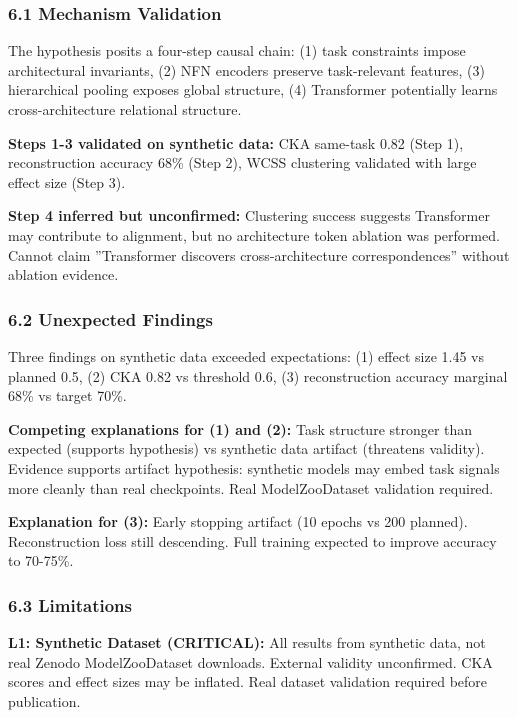 
\subsubsection{6.1 Mechanism Validation}

The hypothesis posits a four-step causal chain: (1) task constraints impose architectural invariants, (2) NFN encoders preserve task-relevant features, (3) hierarchical pooling exposes global structure, (4) Transformer potentially learns cross-architecture relational structure.

\textbf{Steps 1-3 validated on synthetic data:} CKA same-task 0.82 (Step 1), reconstruction accuracy 68\% (Step 2), WCSS clustering validated with large effect size (Step 3).

\textbf{Step 4 inferred but unconfirmed:} Clustering success suggests Transformer may contribute to alignment, but no architecture token ablation was performed. Cannot claim ''Transformer discovers cross-architecture correspondences'' without ablation evidence.

\subsubsection{6.2 Unexpected Findings}

Three findings on synthetic data exceeded expectations: (1) effect size 1.45 vs planned 0.5, (2) CKA 0.82 vs threshold 0.6, (3) reconstruction accuracy marginal 68\% vs target 70\%.

\textbf{Competing explanations for (1) and (2):} Task structure stronger than expected (supports hypothesis) vs synthetic data artifact (threatens validity). Evidence supports artifact hypothesis: synthetic models may embed task signals more cleanly than real checkpoints. Real ModelZooDataset validation required.

\textbf{Explanation for (3):} Early stopping artifact (10 epochs vs 200 planned). Reconstruction loss still descending. Full training expected to improve accuracy to 70-75\%.

\subsubsection{6.3 Limitations}

\textbf{L1: Synthetic Dataset (CRITICAL):} All results from synthetic data, not real Zenodo ModelZooDataset downloads. External validity unconfirmed. CKA scores and effect sizes may be inflated. Real dataset validation required before publication.

